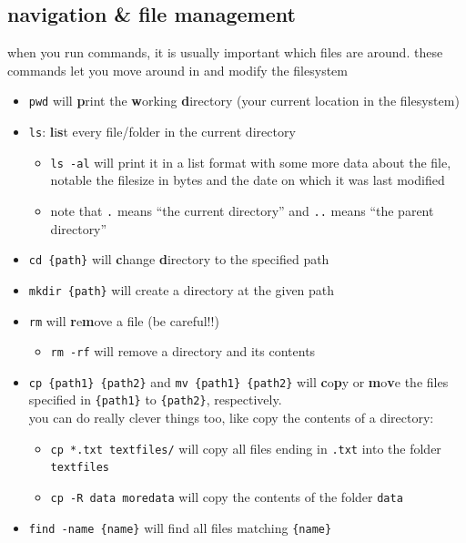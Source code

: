 \documentclass[
]{article}
\providecommand{\tightlist}{%
  \setlength{\itemsep}{0pt}\setlength{\parskip}{0pt}}
\begin{document}
\hypertarget{navigation-file-management}{%
\subsection{navigation \& file
management}\label{navigation-file-management}}

when you run commands, it is usually important which files are around.
these commands let you move around in and modify the filesystem

\begin{itemize}
\item
  \texttt{pwd} will \textbf{p}rint the \textbf{w}orking
  \textbf{d}irectory (your current location in the filesystem)
\item
  \texttt{ls}: \textbf{l}i\textbf{s}t every file/folder in the current
  directory

  \begin{itemize}
  \tightlist
  \item
    \texttt{ls\ -al} will print it in a list format with some more data
    about the file, notable the filesize in bytes and the date on which
    it was last modified
  \item
    note that \texttt{.} means ``the current directory'' and \texttt{..}
    means ``the parent directory''
  \end{itemize}
\item
  \texttt{cd\ \{path\}} will \textbf{c}hange \textbf{d}irectory to the
  specified path
\item
  \texttt{mkdir\ \{path\}} will create a directory at the given path
\item
  \texttt{rm} will \textbf{r}e\textbf{m}ove a file (be careful!!)

  \begin{itemize}
  \tightlist
  \item
    \texttt{rm\ -rf} will remove a directory and its contents
  \end{itemize}
\item
  \texttt{cp\ \{path1\}\ \{path2\}} and
  \texttt{mv\ \{path1\}\ \{path2\}} will \textbf{c}o\textbf{p}y or
  \textbf{m}o\textbf{v}e the files specified in \texttt{\{path1\}} to
  \texttt{\{path2\}}, respectively.\\
  you can do really clever things too, like copy the contents of a
  directory:

  \begin{itemize}
  \tightlist
  \item
    \texttt{cp\ *.txt\ textfiles/} will copy all files ending in
    \texttt{.txt} into the folder \texttt{textfiles}
  \item
    \texttt{cp\ -R\ data\ moredata} will copy the contents of the folder
    \texttt{data}
  \end{itemize}
\item
  \texttt{find\ -name\ \{name\}} will find all files matching
  \texttt{\{name\}}
\end{itemize}
\end{document}
